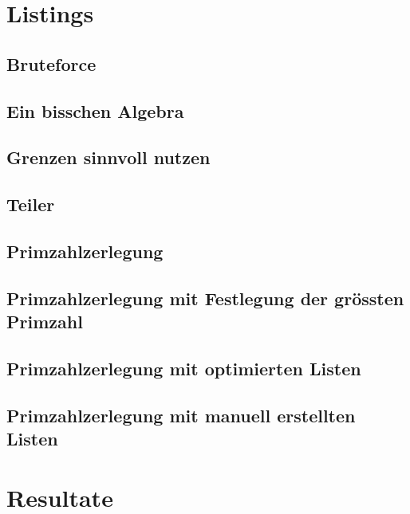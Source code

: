 \documentclass[a4paper, 10pt, fleqn]{article}
\begin{document}
\begin{appendices}

  \section{Listings}
  \subsection{Bruteforce}
  \label{list:1}
  
  \subsection{Ein bisschen Algebra}
  \label{list:2}
  
  \subsection{Grenzen sinnvoll nutzen}
  \label{list:3}
  
  \subsection{Teiler}
  \label{list:4}
  
  \subsection{Primzahlzerlegung}
  \label{list:5}
  
  \subsection{Primzahlzerlegung mit Festlegung der grössten Primzahl}
  \label{list:6}
  
  \subsection{Primzahlzerlegung mit optimierten Listen}
  \label{list:7}
  
  \subsection{Primzahlzerlegung mit manuell erstellten Listen}
  \label{list:8}
    

  \section{Resultate}

\end{appendices}
\end{document}
